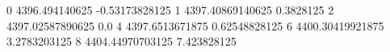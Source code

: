 0 4396.494140625 -0.53173828125
1 4397.40869140625 0.3828125
2 4397.02587890625 0.0
4 4397.6513671875 0.62548828125
6 4400.30419921875 3.2783203125
8 4404.44970703125 7.423828125
